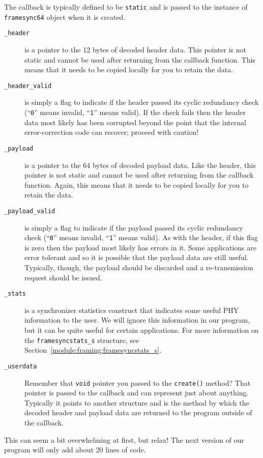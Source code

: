 %
The callback is typically defined to be {\tt static} and is passed to
the instance of {\tt framesync64} object when it is created.
%
\begin{description}
\item[{\tt \_header}]
    is a pointer to the 12 bytes of decoded header data.
    This pointer is not static and cannot be used after returning from
    the callback function.
    This means that it needs to be copied locally for you to retain the
    data.
\item[{\tt \_header\_valid}]
    is simply a flag to indicate if the header passed its cyclic
    redundancy check
    (``{\tt 0}'' means invalid, ``{\tt 1}'' means valid).
    If the check fails then the header data most likely has been
    corrupted beyond the point that the internal error-correction code
    can recover; proceed with caution!
\item[{\tt \_payload}]
    is a pointer to the 64 bytes of decoded payload data.
    Like the header,
    this pointer is not static and cannot be used after returning from
    the callback function.
    Again, this means that it needs to be copied locally for you to retain the
    data.
\item[{\tt \_payload\_valid}]
    is simply a flag to indicate if the payload passed its cyclic
    redundancy check
    (``{\tt 0}'' means invalid, ``{\tt 1}'' means valid).
    As with the header,
    if this flag is zero then the payload most likely has errors in it.
    Some applications are error tolerant and so it is possible that the
    payload data are still useful.
    Typically, though, the payload should be discarded and a
    re-transmission request should be issued.
\item[{\tt \_stats}]
    is a synchronizer statistics construct that indicates some useful
    PHY information to the user.
    We will ignore this information in our program, but it can be quite
    useful for certain applications.
    For more information on the {\tt framesyncstats\_s} structure, see
    Section~\ref{module:framing:framesyncstats_s}.
\item[{\tt \_userdata}]
    Remember that {\tt void} pointer you passed to the {\tt create()}
    method?
    That pointer is passed to the callback and can represent just about
    anything.
    Typically it points to another structure and is the method
    by which the decoded header and payload data are returned to the
    program outside of the callback.
\end{description}
%
This can seem a bit overwhelming at first, but relax!
The next version of our program will only add about 20 lines of code.


